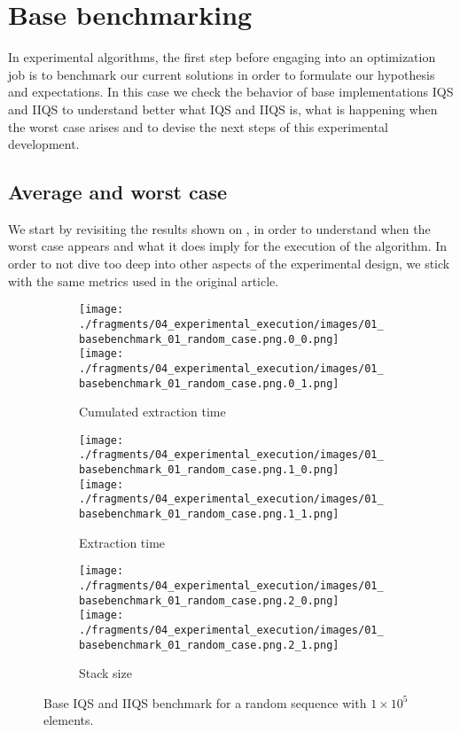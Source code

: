 \section{Base benchmarking}
\label{SUBSECTION:BASE_BENCHMARK}
In experimental algorithms, the first step before engaging into an optimization job is to benchmark our current solutions in order to formulate our hypothesis and expectations. In this case we check the behavior of base implementations IQS and IIQS to understand better what IQS and IIQS is, what is happening when the worst case arises and to devise the next steps of this experimental development.\\

\subsection{Average and worst case}
\label{SUBSECTION:BASE_BENCHMARK__AVERAGE_WORST}

We start by revisiting the results shown on \cite{7416566}, in order to understand when the worst case appears and what it does imply for the execution of the algorithm. In order to not dive too deep into other aspects of the experimental design, we stick with the same metrics used in the original article.\\

\begin{figure}
    \centering
    \begin{subfigure}[b]{\textwidth}
        \centering
        \texttt{[image: ./fragments/04\_experimental\_execution/images/01\_basebenchmark\_01\_random\_case.png.0\_0.png]}
        \texttt{[image: ./fragments/04\_experimental\_execution/images/01\_basebenchmark\_01\_random\_case.png.0\_1.png]}
        \caption{Cumulated extraction time}
        \label{FIG:BENCHMARK_01_RANDOM_CASE__0_0}
    \end{subfigure}

    \begin{subfigure}[b]{\textwidth}
        \centering
        \texttt{[image: ./fragments/04\_experimental\_execution/images/01\_basebenchmark\_01\_random\_case.png.1\_0.png]}
        \texttt{[image: ./fragments/04\_experimental\_execution/images/01\_basebenchmark\_01\_random\_case.png.1\_1.png]}
        \caption{Extraction time}
        \label{FIG:BENCHMARK_01_RANDOM_CASE__0_1}
    \end{subfigure}

    \begin{subfigure}[b]{\textwidth}
        \centering
        \texttt{[image: ./fragments/04\_experimental\_execution/images/01\_basebenchmark\_01\_random\_case.png.2\_0.png]}
        \texttt{[image: ./fragments/04\_experimental\_execution/images/01\_basebenchmark\_01\_random\_case.png.2\_1.png]}
        \caption{Stack size}
        \label{FIG:BENCHMARK_01_RANDOM_CASE__0_2}
    \end{subfigure}
    
    \caption{Base IQS and IIQS benchmark for a random sequence with $1\times10^5$ elements.}
       \label{FIG:BENCHMARK_01_RANDOM_CASE}
\end{figure}

